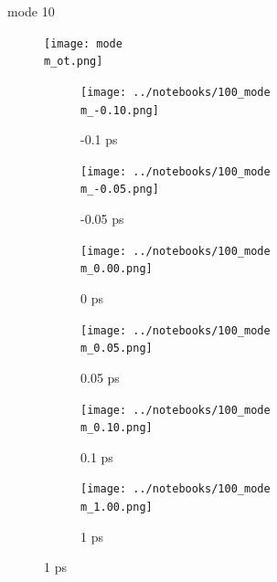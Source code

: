 \documentclass{beamer}
\begin{document}
\renewcommand\m{10}
\begin{frame}{mode \m}
		\vspace{\vh mm}
	\begin{figure}
		\centering
		\texttt{[image: mode\\m\_ot.png]}
	\end{figure}
	\begin{figure}
		\centering
		\begin{subfigure}[b]{\w\textwidth}
			\centering
			\texttt{[image: ../notebooks/100\_mode\\m\_-0.10.png]}
			\caption{-0.1 ps}
		\end{subfigure}
		\begin{subfigure}[b]{\w\textwidth}
			\centering
			\texttt{[image: ../notebooks/100\_mode\\m\_-0.05.png]}
			\caption{-0.05 ps}
		\end{subfigure}
		\begin{subfigure}[b]{\w\textwidth}
			\centering
			\texttt{[image: ../notebooks/100\_mode\\m\_0.00.png]}
			\caption{0 ps}
		\end{subfigure}
		\begin{subfigure}[b]{\w\textwidth}
			\centering
			\texttt{[image: ../notebooks/100\_mode\\m\_0.05.png]}
			\caption{0.05 ps}
		\end{subfigure}
		\begin{subfigure}[b]{\w\textwidth}
			\centering
			\texttt{[image: ../notebooks/100\_mode\\m\_0.10.png]}
			\caption{0.1 ps}
		\end{subfigure}
		\begin{subfigure}[b]{\w\textwidth}
			\centering
			\texttt{[image: ../notebooks/100\_mode\\m\_1.00.png]}
			\caption{1 ps}
		\end{subfigure}
	\end{figure}
\end{frame}
\end{document}
